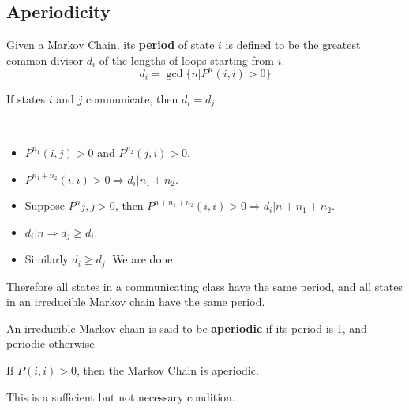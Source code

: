     \subsection{Aperiodicity}
    \begin{definition}[Period]
        Given a Markov Chain, its \textbf{period} of state $i$ is defined to be the greatest common divisor $d_i$ of the lengths of loops starting from $i$.
        \[ d_i = \gcd\{n|P^n(i,i) > 0\} \]
    \end{definition}
    \begin{theorem}
        If states $i$ and $j$ communicate, then $d_i = d_j$
    \end{theorem}
    \begin{sketchproof}
        ~{}
        \begin{itemize}
            \item $P^{n_1}(i,j) > 0$ and $P^{n_2}(j,i) > 0$.
            \item $P^{n_1+n_2}(i,i)>0 \Rightarrow d_i | n_1 + n_2$.
            \item Suppose $P^n{j,j} > 0$, then $P^{n+n_1+n_2}(i,i) > 0 \Rightarrow d_i | n + n_1 + n_2$.
            \item $d_i | n \Rightarrow d_j \ge d_i$.
            \item Similarly $d_i \ge d_j$. We are done.
        \end{itemize}
    \end{sketchproof}
    \begin{remark}
        Therefore all states in a communicating class have the same period, and all states in an irreducible Markov chain have the same period.
    \end{remark}
    \begin{definition}[Aperiodicity]
        An irreducible Markov chain is said to be \textbf{aperiodic} if its period is 1, and periodic otherwise.
    \end{definition}
    \begin{proposition}
        \normalfont
        If $P(i,i) > 0$, then the Markov Chain is aperiodic.
    \end{proposition}
    \begin{remark}
        This is a sufficient but not necessary condition.
    \end{remark}

